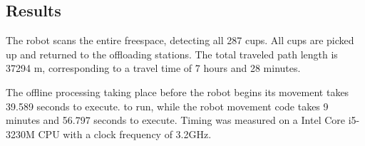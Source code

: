\subsection{Results}
The robot scans the entire freespace, detecting all 287 cups.
All cups are picked up and returned to the offloading stations.
The total traveled path length is 37294 m, corresponding to a travel time of 7 hours and 28 minutes.


The offline processing taking place before the robot begins its movement takes 
39.589 seconds to execute.
to run, while the robot movement code takes 
9 minutes and 56.797 seconds to execute. %
Timing was measured on a Intel Core i5-3230M CPU with a clock frequency of 3.2GHz.


